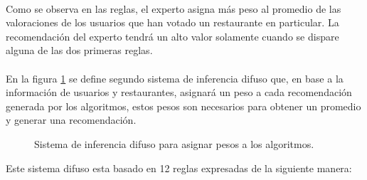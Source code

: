 \documentclass[12pt,letterpaper,oneside] {memoir}
\begin{document}
\paragraph{}
Como se observa en las reglas,  el experto asigna más peso al promedio de las valoraciones de los usuarios que han votado un restaurante en particular. La recomendación del experto tendrá un alto valor solamente cuando se dispare alguna de las dos primeras reglas.
\paragraph{}
En la figura \ref{fig:fisIntegrador} se define segundo sistema de inferencia difuso que, en base a la información de usuarios y restaurantes, asignará un peso a cada recomendación generada por los algoritmos, estos pesos son necesarios para obtener un promedio y generar una recomendación.  \\

\begin{figure}[H] 
\centering 
{} \caption{Sistema de inferencia difuso para asignar pesos a los algoritmos.} 
\label{fig:fisIntegrador} 
\end{figure}

Este sistema difuso esta basado en 12 reglas expresadas de la siguiente manera:
\end{document}
